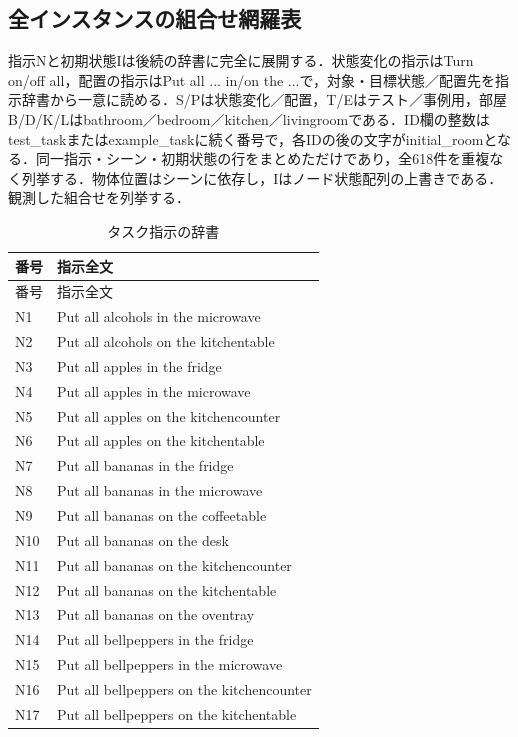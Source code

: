 \subsection{全インスタンスの組合せ網羅表}\label{app:coverage_joint}
指示Nと初期状態Iは後続の辞書に完全に展開する．状態変化の指示はTurn on/off all，配置の指示はPut all ... in/on the ...で，対象・目標状態／配置先を指示辞書から一意に読める．S/Pは状態変化／配置，T/Eはテスト／事例用，部屋B/D/K/Lはbathroom／bedroom／kitchen／livingroomである．ID欄の整数はtest\_taskまたはexample\_taskに続く番号で，各IDの後の文字がinitial\_roomとなる．同一指示・シーン・初期状態の行をまとめただけであり，全618件を重複なく列挙する．物体位置はシーンに依存し，Iはノード状態配列の上書きである．観測した組合せを列挙する．

{\scriptsize\setlength{\tabcolsep}{3pt}
\begin{longtable}{lp{.85\linewidth}}
\caption{タスク指示の辞書}\label{tab:instruction_dictionary}\\
\hline
番号 & 指示全文\\\hline\endfirsthead
番号 & 指示全文\\\hline\endhead
\hline\endfoot
N1 & Put all alcohols in the microwave \\
N2 & Put all alcohols on the kitchentable \\
N3 & Put all apples in the fridge \\
N4 & Put all apples in the microwave \\
N5 & Put all apples on the kitchencounter \\
N6 & Put all apples on the kitchentable \\
N7 & Put all bananas in the fridge \\
N8 & Put all bananas in the microwave \\
N9 & Put all bananas on the coffeetable \\
N10 & Put all bananas on the desk \\
N11 & Put all bananas on the kitchencounter \\
N12 & Put all bananas on the kitchentable \\
N13 & Put all bananas on the oventray \\
N14 & Put all bellpeppers in the fridge \\
N15 & Put all bellpeppers in the microwave \\
N16 & Put all bellpeppers on the kitchencounter \\
N17 & Put all bellpeppers on the kitchentable \\

\end{longtable}}
